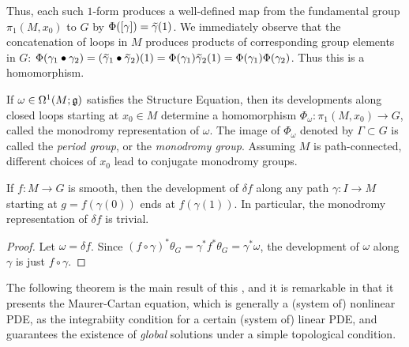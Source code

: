 Thus, each such $1$-form produces a well-defined map from the fundamental group $\pi_1(M,x_0)$ to $G$ by $\Phi([\gamma])=\wt{\gamma}(1)$. We immediately observe that the concatenation of loops in $M$ produces products of corresponding group elements in $G$: $\Phi(\gamma_1\bullet \gamma_2)=(\wt{\gamma}_1\bullet\wt{\gamma}_2)(1)=\Phi(\gamma_1)\wt{\gamma}_2(1)=\Phi(\gamma_1)\Phi(\gamma_2)$. Thus this is a homomorphism.

\begin{defn}
    If $\omega\in\Omega^1(M;\mathfrak{g})$ satisfies the Structure Equation, then its developments along closed loops starting at $x_0\in M$ determine a homomorphism $\Phi_\omega:\pi_1(M,x_0)\to G$, called the monodromy representation of $\omega$. The image of $\Phi_\omega$ denoted by $\Gamma\subset G$ is called the \emph{period group}, or the \emph{monodromy group}. Assuming $M$ is path-connected, different choices of $x_0$ lead to conjugate monodromy groups.
\end{defn}

\begin{prop}\label{prop 7.13 Sharpe}
    If $f:M\to G$ is smooth, then the development of $\delta f$ along any path $\gamma:I\to M$ starting at $g=f(\gamma(0))$ ends at $f(\gamma(1))$. In particular, the monodromy representation of $\delta f$ is trivial.
\end{prop}
\begin{proof}
    Let $\omega=\delta f$. Since $(f\circ \gamma)^\ast \theta_G=\gamma^\ast f^\ast\theta_G=\gamma^\ast\omega$, the development of $\omega$ along $\gamma$ is just $f\circ\gamma$.
\end{proof}

The following theorem is the main result of this \subsect, and it is remarkable in that it presents the Maurer-Cartan equation, which is generally a (system of) nonlinear PDE, as the integrabiity condition for a certain (system of) linear PDE, and guarantees the existence of \emph{global} solutions under a simple topological condition.

